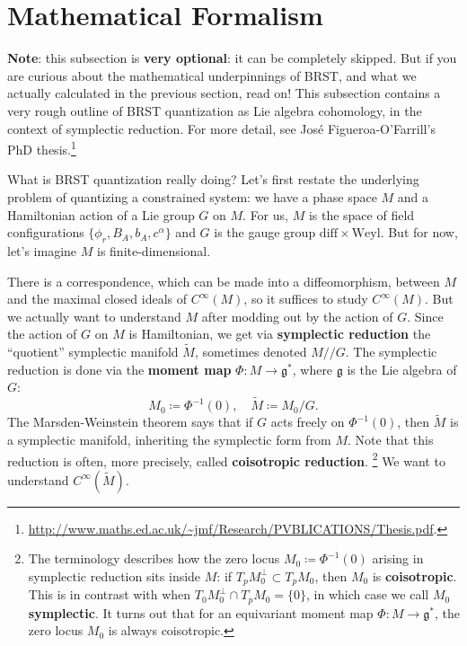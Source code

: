 \documentclass{report}
\theoremstyle{plain}
\theoremstyle{definition}
\theoremstyle{remark}
\newcommand{\fg}{\mathfrak{g}}
\newcommand{\diff}{\mathrm{diff}}
\newcommand{\Weyl}{\mathrm{Weyl}}
\begin{document}
\section{Mathematical Formalism}

{\bf Note}: this subsection is {\bf very optional}: it can be
completely skipped. But if you are curious about the mathematical
underpinnings of BRST, and what we actually calculated in the previous
section, read on! This subsection contains a very rough outline of
BRST quantization as Lie algebra cohomology, in the context of
symplectic reduction. For more detail, see Jos\'e Figueroa-O'Farrill's
PhD thesis.\footnote{\url{http://www.maths.ed.ac.uk/~jmf/Research/PVBLICATIONS/Thesis.pdf}.}

What is BRST quantization really doing? Let's first restate the
underlying problem of quantizing a constrained system: we have a phase
space $M$ and a Hamiltonian action of a Lie group $G$ on $M$. For us,
$M$ is the space of field configurations $\{\phi_r, B_A, b_A,
c^\alpha\}$ and $G$ is the gauge group $\diff \times \Weyl$. But for
now, let's imagine $M$ is finite-dimensional.

There is a correspondence, which can be made into a diffeomorphism,
between $M$ and the maximal closed ideals of $C^\infty(M)$, so it
suffices to study $C^\infty(M)$. But we actually want to understand
$M$ after modding out by the action of $G$. Since the action of $G$ on
$M$ is Hamiltonian, we get via {\bf symplectic reduction} the
``quotient'' symplectic manifold $\tilde{M}$, sometimes denoted
$M//G$. The symplectic reduction is done via the {\bf moment map}
$\Phi\colon M \to \fg^*$, where $\fg$ is the Lie algebra of $G$:
\[ M_0 \coloneqq \Phi^{-1}(0), \quad \tilde{M} \coloneqq M_0/G. \]
The Marsden-Weinstein theorem says that if $G$ acts freely on
$\Phi^{-1}(0)$, then $\tilde{M}$ is a symplectic manifold, inheriting
the symplectic form from $M$. Note that this reduction is often, more
precisely, called {\bf coisotropic reduction}.
\footnote{The terminology describes how the zero locus $M_0 \coloneqq
  \Phi^{-1}(0)$ arising in symplectic reduction sits inside $M$: if
  $T_pM_0^\perp \subset T_pM_0$, then $M_0$ is {\bf coisotropic}. This
  is in contrast with when $T_0M_0^\perp \cap T_pM_0 = \{0\}$, in
  which case we call $M_0$ {\bf symplectic}. It turns out that for an
  equivariant moment map $\Phi\colon M \to \fg^*$, the zero locus
  $M_0$ is always coisotropic.}
We want to understand $C^\infty(\tilde{M})$.
\end{document}
